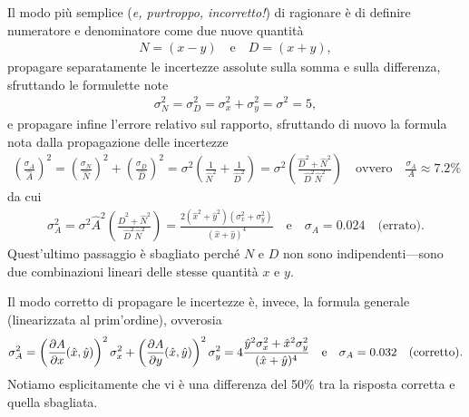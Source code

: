 \begin{solution}

Il modo più semplice (\emph{e, purtroppo, incorretto!}) di ragionare è di
definire numeratore e denominatore come due nuove quantità
\begin{align*}
  N = (x - y) \quad \text{e} \quad D = (x + y),
\end{align*}
propagare separatamente le incertezze assolute sulla somma e sulla differenza,
sfruttando le formulette note
\begin{align*}
  \sigma^2_N = \sigma^2_D = \sigma^2_x + \sigma^2_y = \sigma^2 = 5,
\end{align*}
e propagare infine l'errore relativo sul rapporto, sfruttando di nuovo la formula
nota dalla propagazione delle incertezze
\begin{align*}
  \left(\frac{\sigma_A}{\hat{A}}\right)^2 =
  \left(\frac{\sigma_N}{\hat{N}}\right)^2 + \left(\frac{\sigma_D}{\hat{D}}\right)^2 =
  \sigma^2 \left( \frac{1}{\hat{N}^2} + \frac{1}{\hat{D}^2} \right) =
  \sigma^2 \left( \frac{\hat{D}^2 + \hat{N}^2}{\hat{D}^2\hat{N}^2} \right)
  \quad \text{ovvero} \quad \frac{\sigma_A}{A} \approx 7.2\%
\end{align*}
da cui
\begin{align*}
  \sigma^2_A = \sigma^2 \hat{A}^2 \left( \frac{\hat{D}^2 + \hat{N}^2}{\hat{D}^2\hat{N}^2} \right) =
  \frac{2\left(\hat{x}^2 + \hat{y}^2\right) \left(\sigma^2_x + \sigma^2_y\right)}{(\hat{x} + \hat{y})^4}
  \quad \text{e} \quad \sigma_A = 0.024 \quad \text{(errato)}.
\end{align*}
Quest'ultimo passaggio è sbagliato perché $N$ e $D$ non sono indipendenti---sono
due combinazioni lineari delle stesse quantità $x$ e $y$.

Il modo corretto di propagare le incertezze è, invece, la formula generale
(linearizzata al prim'ordine), ovverosia
\begin{align*}
  \sigma^2_A = \left( \pd{A}{x}{\hat{x}, \hat{y}} \right)^2 \sigma^2_x +
  \left( \pd{A}{y}{\hat{x}, \hat{y}} \right)^2 \sigma^2_y =
  4 \frac{\hat{y}^2\sigma^2_x + \hat{x}^2\sigma^2_y}{(\hat{x} + \hat{y})^4}
  \quad \text{e} \quad \sigma_A = 0.032 \quad \text{(corretto)}.
\end{align*}
Notiamo esplicitamente che vi è una differenza del 50\% tra la risposta corretta
e quella sbagliata.

\end{solution}